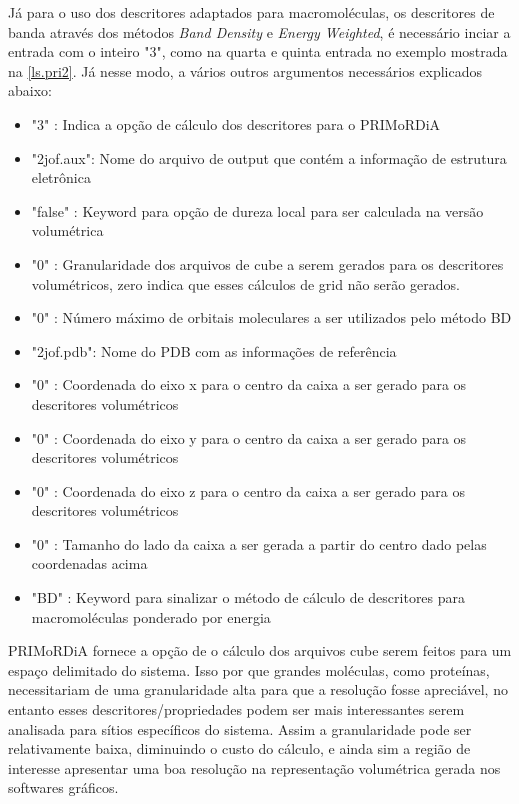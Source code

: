 \documentclass[a4paper,11pt]{refart}
\begin{document}
Já para o uso dos descritores adaptados para macromoléculas, os descritores de banda através dos métodos \textit{Band Density} e \textit{Energy Weighted}, é necessário inciar a entrada com o inteiro "3", como na quarta e quinta entrada no exemplo mostrada na \autoref{ls.pri2}. Já nesse modo, a vários outros argumentos necessários explicados abaixo:

\begin{itemize}
	\item "3" : Indica a opção de cálculo dos descritores para o PRIMoRDiA
	\item "2jof.aux": Nome do arquivo de output que contém a informação de estrutura eletrônica
	\item "false" : Keyword para opção de dureza local para ser calculada na versão volumétrica
	\item "0" : Granularidade dos arquivos de cube a serem gerados para os descritores volumétricos, zero indica que esses cálculos de grid não serão gerados.
	\item "0" : Número máximo de orbitais moleculares a ser utilizados pelo método BD
	\item "2jof.pdb": Nome do PDB com as informações de referência
	\item "0" : Coordenada do eixo x para o centro da caixa a ser gerado para os descritores volumétricos
	\item "0" : Coordenada do eixo y para o centro da caixa a ser gerado para os descritores volumétricos
	\item "0" : Coordenada do eixo z para o centro da caixa a ser gerado para os descritores volumétricos
	\item "0" : Tamanho do lado da caixa a ser gerada a partir do centro dado pelas coordenadas acima
	\item "BD" : Keyword para sinalizar o método de cálculo de descritores para macromoléculas ponderado por energia
\end{itemize}

PRIMoRDiA fornece a opção de o cálculo dos arquivos cube serem feitos para um espaço delimitado do sistema. Isso por que grandes moléculas, como proteínas, necessitariam de uma granularidade alta para que a resolução fosse apreciável, no entanto esses descritores/propriedades podem ser mais interessantes serem analisada para sítios específicos do sistema. Assim a granularidade pode ser relativamente baixa, diminuindo o custo do cálculo, e ainda sim a região de interesse apresentar uma boa resolução na representação volumétrica gerada nos softwares gráficos. 
\end{document}

